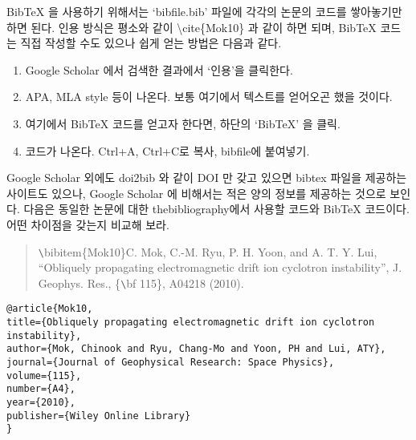 BibTeX 을 사용하기 위해서는 `bibfile.bib' 파일에 각각의 논문의 코드를 쌓아놓기만 하면 된다. 인용 방식은 평소와 같이 \textbackslash cite\{Mok10\} 과 같이 하면 되며, BibTeX 코드는 직접 작성할 수도 있으나 쉽게 얻는 방법은 다음과 같다.
\begin{enumerate}
	\item Google Scholar 에서 검색한 결과에서 `인용'을 클릭한다.
	\item APA, MLA style 등이 나온다. 보통 여기에서 텍스트를 얻어오곤 했을 것이다.
	\item 여기에서 BibTeX 코드를 얻고자 한다면, 하단의 `BibTeX' 을 클릭.
	\item 코드가 나온다. Ctrl+A, Ctrl+C로 복사, bibfile에 붙여넣기.
\end{enumerate}
Google Scholar 외에도 doi2bib 와 같이 DOI 만 갖고 있으면 bibtex 파일을 제공하는 사이트도 있으나, Google Scholar 에 비해서는 적은 양의 정보를 제공하는 것으로 보인다. 다음은 동일한 논문에 대한 thebibliography에서 사용할 코드와 BibTeX 코드이다. 어떤 차이점을 갖는지 비교해 보라.
\begin{quote}
	\verb+\+bibitem\{Mok10\}C. Mok, C.-M. Ryu, P. H. Yoon, and A. T. Y. Lui, ``Obliquely propagating electromagnetic drift ion cyclotron instability'', J. Geophys. Res., \{\verb+\+bf 115\}, A04218 (2010).
\end{quote}
\begin{lstlisting}
@article{Mok10,
title={Obliquely propagating electromagnetic drift ion cyclotron instability},
author={Mok, Chinook and Ryu, Chang-Mo and Yoon, PH and Lui, ATY},
journal={Journal of Geophysical Research: Space Physics},
volume={115},
number={A4},
year={2010},
publisher={Wiley Online Library}
}
\end{lstlisting}